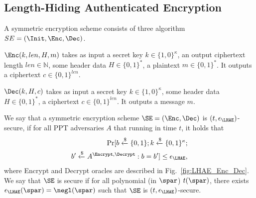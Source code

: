 \subsection{Length-Hiding Authenticated Encryption} \label{sec:SE}

A symmetric encryption scheme consists of three algorithm $SE = (\Init, \Enc, \Dec)$.
\begin{itemize}
 \item{$\Enc(k,len,H,m)$ takes as input a secret key $k \in \{1,0\}^{\kappa}$, an output ciphertext length $len \in \mathbb{N}$, some header data $H \in \{0,1\}^{\ast}$, a plaintext $m \in \{0,1\}^{\ast}$. It outputs a ciphertext $c \in \{0,1\}^{len}$.
 \item{$\Dec(k,H,c)$ takes as input a secret key $k \in \{1,0\}^{\kappa}$, some header data $H \in \{0,1\}^{\ast}$, a ciphertext $c \in \{0,1\}^{len}$}. It outputs a message $m$.}
\end{itemize}

\begin{definition}
 We say that a symmetric encryption scheme $\SE = (\Enc,\Dec)$ is $(t, \epsilon_{\LHAE})$-secure, if for all PPT adversaries $A$ that running in time $t$, it holds that
 \begin{eqnarray}
  \Pr[b\xleftarrow{\$}\{0,1\}; k\xleftarrow{\$}\{0,1\}^{\kappa}; \nonumber \\
   b^{\prime} \xleftarrow{\$} A^{\Encrypt, \Decrypt} : b = b^{\prime}] \leq \epsilon_{\LHAE},
 \end{eqnarray}
where Encrypt and Decrypt oracles are described in Fig.~\ref{fig:LHAE_Enc_Dec}.
We say that $\SE$ is secure if
 for all polynomial (in $\spar$) $t(\spar)$,
 there exists $\epsilon_{\LHAE}(\spar)=\negl(\spar)$
 such that $\SE$ is $(t, \epsilon_{\LHAE})$-secure.

\end{definition}

